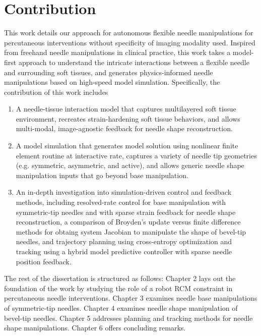 






\section{Contribution}
\label{sec:contribution}

This work details our approach for autonomous flexible needle manipulations for percutaneous interventions without specificity of imaging modality used. Inspired from freehand needle manipulations in clinical practice, this work takes a model-first approach to understand the intricate interactions between a flexible needle and surrounding soft tissues, and generates physics-informed needle manipulations based on high-speed model simulation. Specifically, the contribution of this work includes
\begin{enumerate}[label*=\arabic*.]
\item A needle-tissue interaction model that captures multilayered soft tissue environment, recreates strain-hardening soft tissue behaviors, and allows multi-modal, image-agnostic feedback for needle shape reconstruction.
\item A model simulation that generates model solution using nonlinear finite element routine at interactive rate, captures a variety of needle tip geometries (e.g. symmetric, asymmetric, and active), and allows generic needle shape manipulation inputs that go beyond base manipulation.
\item An in-depth investigation into simulation-driven control and feedback methods, including resolved-rate control for base manipulation with symmetric-tip needles and with sparse strain feedback for needle shape reconstruction, a comparison of Broyden's update versus finite difference methods for obtaing system Jacobian to manipulate the shape of bevel-tip needles, and trajectory planning using cross-entropy optimization and tracking using a hybrid model predictive controller with sparse needle position feedback.
\end{enumerate}

The rest of the dissertation is structured as follows: Chapter 2 lays out the foundation of the work by studying the role of a robot RCM constraint in percutaneous needle interventions. Chapter 3 examines needle base manipulations of symmetric-tip needles. Chapter 4 examines needle shape manipulation of bevel-tip needles. Chapter 5 addresses planning and tracking methods for needle shape manipulations. Chapter 6 offers concluding remarks.

